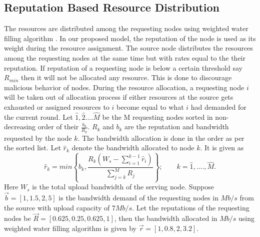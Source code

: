\documentclass[journal]{IEEEtran}
\begin{document}
\subsection{Reputation Based Resource Distribution }
\label{allocation}
The resources are distributed among the requesting nodes using weighted water filling algorithm \cite{MaKiGame}. In our proposed model, the reputation of the node is used as its weight during the resource assignment. The source node  distributes the resources among the requesting nodes at the same time but with rates equal to the their reputation.  If reputation of a requesting node is below a certain threshold say $R_{min}$ then it will not be allocated any resource. This is done to discourage malicious behavior of nodes. During the resource allocation, a requesting node $i$ will be taken out of allocation process if either resources at the source gets exhausted or assigned resources to $i$ become equal to what $i$ had demanded for the current round. Let $\hat{1}, \hat{2}....\hat{M}$ be the M requesting nodes sorted in non-decreasing order of their $\frac{b_k}{R_k}$. $R_k$  and $b_k$ are the reputation and bandwidth requested by the node $k$. The bandwidth allocation is done in the order as per the sorted list. Let $\hat{r}_{k}$ denote the bandwidth allocated to node $k$. It is given as
\begin{equation}
	\label{allc}
	\hat{r}_{k}=min\left\{b_{k},\frac{R_{k}(W_s-\sum\limits_{i=1}^{k-1}\hat{r}_i)}{\sum\limits_{j=k}^{M}R_j}\right\}; \qquad k=\hat{1},....,\hat{M}.
\end{equation} 
Here $W_s$ is the total upload bandwidth of the serving node. Suppose $\overrightarrow{b}=[1,1.5,2,5]$ is the bandwidth demand of the requesting nodes in $Mb/s$ from the source with upload capacity of $7Mb/s$. Let the reputations of the requesting nodes be  $\overrightarrow{R}=[0.625,0.25,0.625,1]$, then the bandwidth allocated in $Mb/s$ using weighted water filling algorithm is given by $\overrightarrow{r}=[1,0.8,2,3.2]$. 
\end{document}
